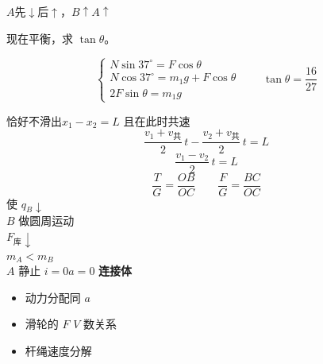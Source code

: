 $A$先$\downarrow$后$\uparrow$，$B\uparrow$\quad $A\uparrow$ %
\begin{problem}
现在平衡，求 $\tan\theta$。
\begin{solution}
\[
\begin{cases}
N\sin37^\circ=F\cos\theta\\
N\cos37^\circ=m_1g+F\cos\theta\\
2F\sin\theta=m_1g
\end{cases}
\qquad \tan\theta=\dfrac{16}{27}
\]
\end{solution}
\end{problem}
恰好不滑出\quad $x_1-x_2=L$ 且在此时共速
\[
\frac{v_1+v_{\text{共}}}{2}\,t-\frac{v_2+v_{\text{共}}}{2}\,t=L
\]
\[
\frac{v_1-v_2}{2}\,t=L
\]
\[
\frac{T}{G}=\frac{OB}{OC}\qquad \frac{F}{G}=\frac{BC}{OC}
\]
使 $q_B\downarrow$ \\
$B$ 做圆周运动 \\
$F_{\text{库}}\downarrow$ \\
$m_A<m_B$ \\
$A$ 静止
$i=0$\quad $a=0$ %
\textbf{连接体}
\begin{itemize}
\item 动力分配\quad 同 $a$
\item 滑轮的 $F$ $V$ 数关系 %
\item 杆绳\quad 速度分解
\end{itemize}
